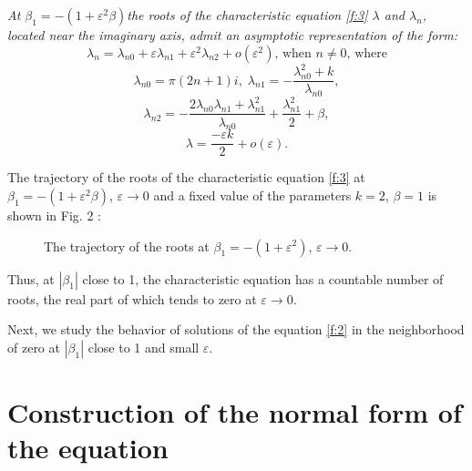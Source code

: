 \documentclass[12pt]{article} %
\newcommand{\eps}{\varepsilon}
\begin{document}
 {\sl At \(\beta_1=-(1+\eps^2\beta)\)the roots of the characteristic equation \eqref{f:3} $\lambda$ and $\lambda_n$, located near the imaginary axis, admit an asymptotic representation of the form:}
\[
\lambda_n=\lambda_{n0}+ \varepsilon\lambda_{n1}+\varepsilon^{2}\lambda_{n2}+o(\varepsilon^{2}),\,\text{when }n\neq0\text{, where} 
\]
\[
\lambda_{n0}=\pi (2n+1)i,\;
\lambda_{n1}=-\frac{\lambda_{n0}^{2}+k}{\lambda_{n0}},
\]
\[
\lambda_{n2}=-\frac{2\lambda_{n0}\lambda_{n1}+\lambda_{n1}^2}{\lambda_{n0}}+\frac{\lambda_{n1}^2}{2}+\beta,
\]
\[
\lambda= \frac{-\varepsilon k}{2}+o(\varepsilon) .
\]


The trajectory of the roots of the characteristic equation \eqref{f:3} at $\beta_1=-(1+\eps^2\beta)$, $\eps\to 0$ and a fixed value of the parameters $k=2$, $\beta=1$ is shown in Fig. 2 :

\begin{figure}[h!]
\caption{The trajectory of the roots at $\beta_1=-(1+\eps^2)$, $\eps\to 0$.}%
\label{fig:12}
\end{figure}

Thus, at $|\beta_1|$ close to 1, the characteristic equation has a countable number of roots, the real part of which tends to zero at $\eps\rightarrow 0$.

Next, we study the behavior of solutions of the equation \eqref{f:2} in the neighborhood of zero at $|\beta_1|$ close to 1 and small $\eps$.

\newpage

\section{Construction of the normal form of the equation}
\end{document}

